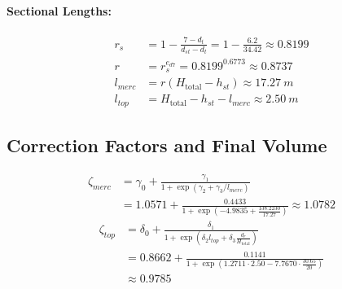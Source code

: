 \documentclass[twocolumn, bibliography=totoc]{scrartcl}
\begin{document}
\paragraph{Sectional Lengths:}
\begin{equation}
\begin{aligned}
    r_s &= 1 - \frac{7 - d_t}{d_{st} - d_t} = 1 - \frac{6.2}{34.42} \approx 0.8199 \\
    r &= r_s^{e_{d7}} = 0.8199^{0.6773} \approx 0.8737 \\
    l_{merc} &= r (H_{\text{total}} - h_{st}) \approx \qty{17.27}{m} \\
    l_{top} &= H_{\text{total}} - h_{st} - l_{merc} \approx \qty{2.50}{m}
\end{aligned}
\end{equation}

\subsection{Correction Factors and Final Volume}
\begin{equation}
\begin{aligned}
    \zeta_{merc} &= \gamma_0 + \frac{\gamma_1}{1 + \exp\left( \gamma_2 + \gamma_3 / l_{merc} \right)} \\
    &= 1.0571 + \frac{0.4433}{1 + \exp(-4.9835 + \frac{138.2230}{17.27})} \approx \mathbf{1.0782}
\end{aligned}
\end{equation}
\begin{equation}
\begin{aligned}
    \zeta_{top} &= \delta_0 + \frac{\delta_1}{1 + \exp\left( \delta_2 l_{top} + \delta_3 \frac{d_r}{H_{\text{total}}} \right)} \\
    &= 0.8662 + \frac{0.1141}{1 + \exp(1.2711 \cdot 2.50 - 7.7670 \cdot \frac{30.65}{20})}\\
    & \approx \mathbf{0.9785}
\end{aligned}
\end{equation}
\end{document}
